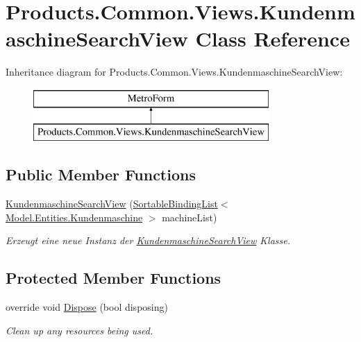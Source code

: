 \hypertarget{class_products_1_1_common_1_1_views_1_1_kundenmaschine_search_view}{}\section{Products.\+Common.\+Views.\+Kundenmaschine\+Search\+View Class Reference}
\label{class_products_1_1_common_1_1_views_1_1_kundenmaschine_search_view}
Inheritance diagram for Products.\+Common.\+Views.\+Kundenmaschine\+Search\+View\+:\begin{figure}[H]
\begin{center}
\leavevmode
\includegraphics[height=2.000000cm]{class_products_1_1_common_1_1_views_1_1_kundenmaschine_search_view}
\end{center}
\end{figure}
\subsection*{Public Member Functions}
\begin{DoxyCompactItemize}
\item 
\hyperlink{class_products_1_1_common_1_1_views_1_1_kundenmaschine_search_view_a9bfb5339a3a82fa839c1c4fa7d2d9ee0}{Kundenmaschine\+Search\+View} (\hyperlink{class_products_1_1_common_1_1_sortable_binding_list}{Sortable\+Binding\+List}$<$ \hyperlink{class_products_1_1_model_1_1_entities_1_1_kundenmaschine}{Model.\+Entities.\+Kundenmaschine} $>$ machine\+List)
\begin{DoxyCompactList}\small\item\em Erzeugt eine neue Instanz der \hyperlink{class_products_1_1_common_1_1_views_1_1_kundenmaschine_search_view}{Kundenmaschine\+Search\+View} Klasse. \end{DoxyCompactList}\end{DoxyCompactItemize}
\subsection*{Protected Member Functions}
\begin{DoxyCompactItemize}
\item 
override void \hyperlink{class_products_1_1_common_1_1_views_1_1_kundenmaschine_search_view_a2346551f2e4905369fd2729f6eed9fc1}{Dispose} (bool disposing)
\begin{DoxyCompactList}\small\item\em Clean up any resources being used. \end{DoxyCompactList}\end{DoxyCompactItemize}
